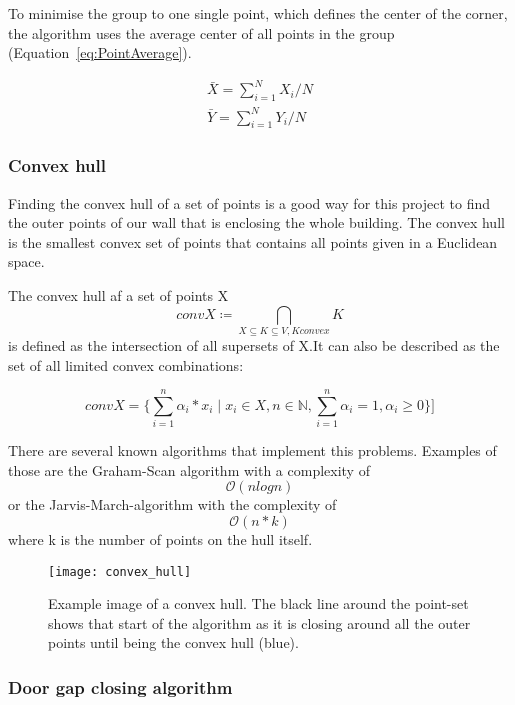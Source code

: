 To minimise the group to one single point, which defines the center of the corner, the algorithm uses the average center of all points in the group (Equation~\ref{eq:PointAverage}).


\begin{equation} \label{eq:PointAverage}
\begin{gathered}
\bar{X} = \sum_{i=1}^{N}X_{i}/N
\\
\bar{Y} = \sum_{i=1}^{N}Y_{i}/N
\end{gathered}
\end{equation}

\subsubsection{Convex hull}
Finding the convex hull of a set of points is a good way for this project to find the outer points of our wall that is enclosing the whole building. The convex hull is the smallest convex set of points that contains all points given in a Euclidean space.

The convex hull af a set of points X \[conv X \coloneqq \underset{X \subseteq K \subseteq V, K convex}{\bigcap} K  \] is defined as the intersection of all supersets of X.It can also be described as the set of all limited convex combinations:

\[conv X = \{ \sum_{i=1}^{n}\alpha_{i} * x_{i} \mid x_{i} \in X, n \in \mathbb{N}, \sum_{i=1}^{n} \alpha_i = 1, \alpha_i \geq 0  \}]\]

There are several known algorithms that implement this problems. Examples of those are the Graham-Scan algorithm with a complexity of  \[\mathcal{O}(n log n)\] or the Jarvis-March-algorithm with the complexity of \[\mathcal{O}(n*k)\] where k is the number of points on the hull itself.

\begin{figure}[h]
	\centering
	\texttt{[image: convex\_hull]}
	\caption{Example image of a convex hull. The black line around the point-set shows that start of the algorithm as it is closing around all the outer points until  being the convex hull (blue).}
	\label{fig:convex_hull}
\end{figure}

\subsubsection{Door gap closing algorithm}

